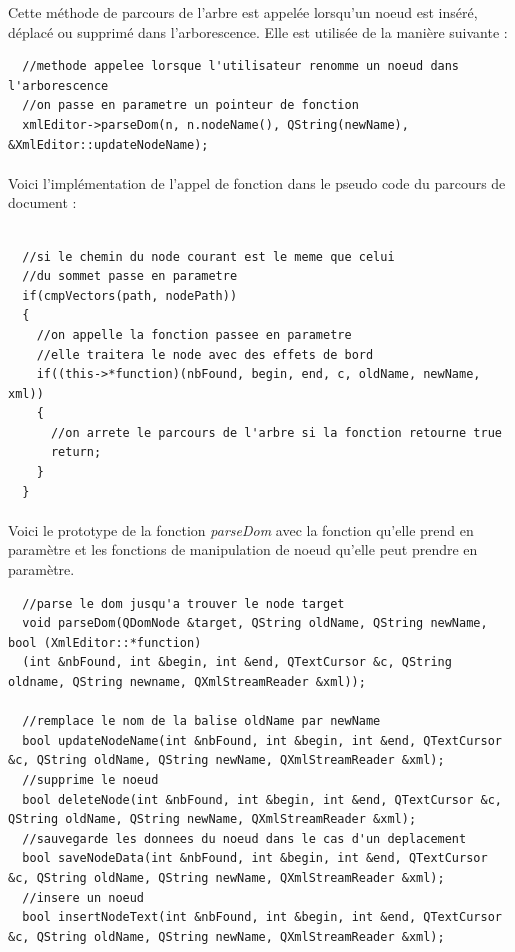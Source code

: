 Cette méthode de parcours de l'arbre est appelée lorsqu'un noeud est inséré, déplacé ou supprimé dans l'arborescence. Elle est utilisée de la manière suivante :

\begin{lstlisting}
  //methode appelee lorsque l'utilisateur renomme un noeud dans l'arborescence
  //on passe en parametre un pointeur de fonction
  xmlEditor->parseDom(n, n.nodeName(), QString(newName), &XmlEditor::updateNodeName);
\end{lstlisting}
\paragraph{}
Voici l'implémentation de l'appel de fonction dans le pseudo code du parcours de document :
\begin{lstlisting}
  
  //si le chemin du node courant est le meme que celui
  //du sommet passe en parametre
  if(cmpVectors(path, nodePath))
  {
    //on appelle la fonction passee en parametre
    //elle traitera le node avec des effets de bord
    if((this->*function)(nbFound, begin, end, c, oldName, newName, xml))
    {
      //on arrete le parcours de l'arbre si la fonction retourne true
      return;
    }
  }
\end{lstlisting}
\paragraph{}
Voici le prototype de la fonction \textit{parseDom} avec la fonction qu'elle prend en paramètre et les fonctions de manipulation de noeud qu'elle peut prendre en paramètre.

\begin{lstlisting}
  //parse le dom jusqu'a trouver le node target
  void parseDom(QDomNode &target, QString oldName, QString newName, bool (XmlEditor::*function)
  (int &nbFound, int &begin, int &end, QTextCursor &c, QString oldname, QString newname, QXmlStreamReader &xml));
  
  //remplace le nom de la balise oldName par newName
  bool updateNodeName(int &nbFound, int &begin, int &end, QTextCursor &c, QString oldName, QString newName, QXmlStreamReader &xml);
  //supprime le noeud
  bool deleteNode(int &nbFound, int &begin, int &end, QTextCursor &c, QString oldName, QString newName, QXmlStreamReader &xml);
  //sauvegarde les donnees du noeud dans le cas d'un deplacement
  bool saveNodeData(int &nbFound, int &begin, int &end, QTextCursor &c, QString oldName, QString newName, QXmlStreamReader &xml);
  //insere un noeud
  bool insertNodeText(int &nbFound, int &begin, int &end, QTextCursor &c, QString oldName, QString newName, QXmlStreamReader &xml);
\end{lstlisting}
